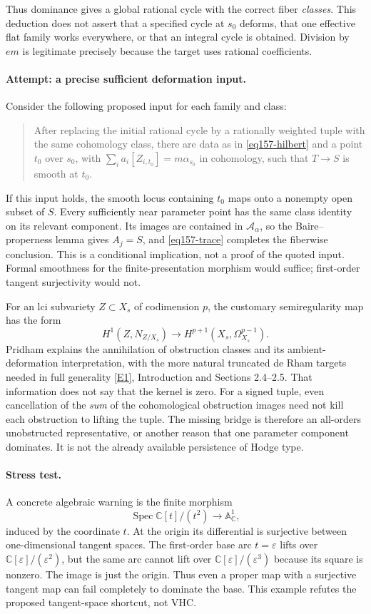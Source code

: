 \documentclass[11pt,a4paper]{article}
\newcommand{\C}{\mathbb{C}}
\newcommand{\A}{\mathbb{A}}
\newcommand{\eref}[2]{\hyperlink{extra:#1:#2}{[E#2]}}
\numberwithin{equation}{section}
\begin{document}
Thus dominance gives a global rational cycle with the correct fiber
\emph{classes}. This deduction does not assert that a specified cycle at
$s_0$ deforms, that one effective flat family works everywhere, or that an
integral cycle is obtained. Division by $em$ is legitimate precisely
because the target uses rational coefficients.

\paragraph{Attempt: a precise sufficient deformation input.}
Consider the following proposed input for each family and class:
\begin{quote}
After replacing the initial rational cycle by a rationally weighted tuple
with the same cohomology class, there are data as in
\eqref{eq157-hilbert} and a point $t_0$ over $s_0$, with
$\sum_i a_i[Z_{i,t_0}]=m\alpha_{s_0}$ in cohomology, such that
$T\to S$ is smooth at $t_0$.
\end{quote}
If this input holds, the smooth locus containing $t_0$ maps onto a
nonempty open subset of $S$. Every sufficiently near parameter point has
the same class identity on its relevant component. Its images are
contained in $\mathcal A_\alpha$, so the Baire--properness lemma gives
$A_j=S$, and \eqref{eq157-trace} completes the fiberwise conclusion. This
is a conditional implication, not a proof of the quoted input.
Formal smoothness for the finite-presentation morphism would suffice;
first-order tangent surjectivity would not.

For an lci subvariety $Z\subset X_s$ of codimension $p$, the customary
semiregularity map has the form
\[
 H^1(Z,N_{Z/X_s})\longrightarrow
 H^{p+1}(X_s,\Omega_{X_s}^{p-1}).
\]
Pridham explains the annihilation of obstruction classes and its
ambient-deformation interpretation, with the more natural truncated
de Rham targets needed in full generality \eref{30006758}{1}, Introduction
and Sections 2.4--2.5. That information does not say that the kernel is
zero. For a signed tuple, even cancellation of the \emph{sum} of the
cohomological obstruction images need not kill each obstruction to
lifting the tuple. The missing bridge is therefore an all-orders
unobstructed representative, or another reason that one parameter
component dominates. It is not the already available persistence of
Hodge type.

\paragraph{Stress test.}
A concrete algebraic warning is the finite morphism
\[
 \operatorname{Spec}\C[t]/(t^2)\longrightarrow\A^1_{\C},
\]
induced by the coordinate $t$. At the origin its differential is
surjective between one-dimensional tangent spaces. The first-order base
arc $t=\varepsilon$ lifts over $\C[\varepsilon]/(\varepsilon^2)$, but the
same arc cannot lift over $\C[\varepsilon]/(\varepsilon^3)$ because its
square is nonzero. The image is just the origin. Thus even a proper map
with a surjective tangent map can fail completely to dominate the base.
This example refutes the proposed tangent-space shortcut, not VHC.
\end{document}

